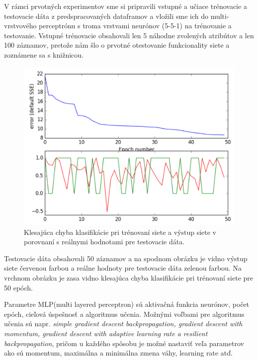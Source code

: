 \documentclass{iitsrc}
\begin{document}
\begin{multicols}{2}
V rámci prvotných experimentov sme si pripravili vstupné a učiace trénovacie a testovacie dáta z predspracovaných dataframov a vložili sme ich do multi-vrstvového perceptrónu s troma vrstvami neurónov (5-5-1) na trénovanie a testovanie. Vstupné trénovacie obsahovali len 5 náhodne zvolených atribútov a len 100 záznamov, pretože nám šlo o prvotné otestovanie funkcionality siete a zoznámene sa s knižnicou.

\begin{figure}[H]
    \begin{center}
        \includegraphics[width=\linewidth]{results}
        \caption{Klesajúca chyba klasifikácie pri trénovaní siete a výstup siete v porovnaní s reálnymi hodnotami pre testovacie dáta.}
    \end{center}
\end{figure}

Testovacie dáta obsahovali 50 záznamov a na spodnom obrázku je vidno výstup siete červenou farbou a reálne hodnoty pre testovacie dáta zelenou farbou. Na vrchnom obrázku je zasa vidno klesajúca chyba klasifikácie pri trénovaní siete pre 50 epóch.

Parametre MLP(multi layered perceptron) sú aktivačná funkcia neurónov, počet epóch, cieľová úspešnosť  a  algoritmus učenia. Možnými voľbami pre algoritmus učenia sú napr. \emph{simple gradient descent backpropagation, gradient descent with momentum, gradient descent with adaptive learning rate a resilient backpropagation}, pričom u každého spôsobu je možné nastaviť veľa parametrov ako sú momentum, maximálna a minimálna zmena váhy, learning rate atď.


\end{multicols}
\end{document}
